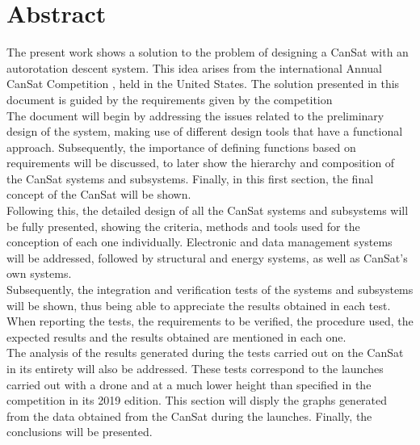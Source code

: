 \chapter{Abstract}

The present work shows a solution to the problem of designing a CanSat with an autorotation descent system. This idea arises from the international Annual CanSat Competition \cite{CanSat-competition-website}, held in the United States. The solution presented in this document is guided by the requirements given by the competition\\

\noindent The document will begin by addressing the issues related to the preliminary design of the system, making use of different design tools that have a functional approach. Subsequently, the importance of defining functions based on requirements will be discussed, to later show the hierarchy and composition of the CanSat systems and subsystems. Finally, in this first section, the final concept of the CanSat will be shown.\\

\noindent Following this, the detailed design of all the CanSat systems and subsystems will be fully presented, showing the criteria, methods and tools used for the conception of each one individually. Electronic and data management systems will be addressed, followed by structural and energy systems, as well as CanSat's own systems.\\

\noindent Subsequently, the integration and verification tests of the systems and subsystems will be shown, thus being able to appreciate the results obtained in each test. When reporting the tests, the requirements to be verified, the procedure used, the expected results and the results obtained are mentioned in each one.\\

\noindent The analysis of the results generated during the tests carried out on the CanSat in its entirety will also be addressed. These tests correspond to the launches carried out with a drone and at a much lower height than specified in the competition in its 2019 edition. This section will disply the graphs generated from the data obtained from the CanSat during the launches. Finally, the conclusions will be presented.\\

